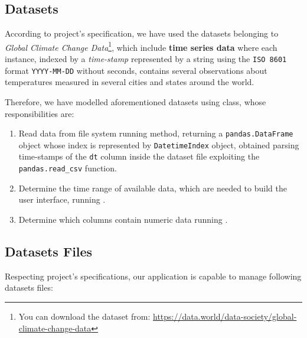 \documentclass[sigconf]{acmart}
\begin{document}
\subsection{Datasets}

According to project's specification, we have used the datasets belonging to \textit{Global Climate Change Data}\footnote{You can download the dataset from: \url{https://data.world/data-society/global-climate-change-data}}, which include \textbf{time series data} where each instance, indexed by a \textit{time-stamp} represented by a string using the \texttt{ISO 8601} format \texttt{YYYY-MM-DD} without seconds, contains several observations about temperatures measured in several cities and states around the world.

Therefore, we have modelled aforementioned datasets using  class, whose responsibilities are:
\begin{enumerate}
\item Read data from file system running  method, returning a \texttt{pandas.DataFrame} object whose index is represented by \texttt{DatetimeIndex} object, obtained parsing time-stamps of the \texttt{dt} column inside the dataset file exploiting the \texttt{pandas.read\_csv} function.

\item Determine the time range of available data, which are needed to build the user interface, running .

\item Determine which columns contain numeric data running .
\end{enumerate}

\subsection{Datasets Files}

Respecting project's specifications, our application is capable to manage following datasets files:
\end{document}
